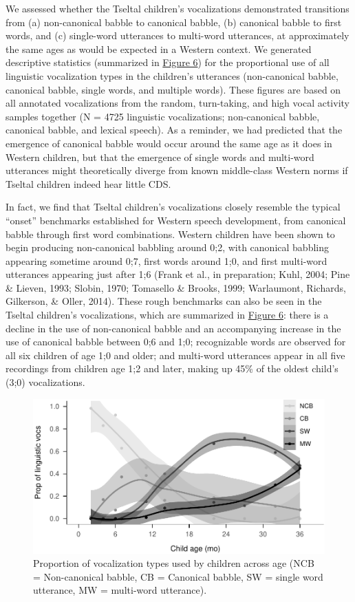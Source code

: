 \documentclass[,man,floatsintext]{apa6}
\begin{document}
We assessed whether the Tseltal children's vocalizations demonstrated
transitions from (a) non-canonical babble to canonical babble, (b)
canonical babble to first words, and (c) single-word utterances to
multi-word utterances, at approximately the same ages as would be
expected in a Western context. We generated descriptive statistics
(summarized in \protect\hyperlink{fig6}{Figure 6}) for the proportional
use of all linguistic vocalization types in the children's utterances
(non-canonical babble, canonical babble, single words, and multiple
words). These figures are based on all annotated vocalizations from the
random, turn-taking, and high vocal activity samples together (N = 4725
linguistic vocalizations; non-canonical babble, canonical babble, and
lexical speech). As a reminder, we had predicted that the emergence of
canonical babble would occur around the same age as it does in Western
children, but that the emergence of single words and multi-word
utterances might theoretically diverge from known middle-class Western
norms if Tseltal children indeed hear little CDS.

In fact, we find that Tseltal children's vocalizations closely resemble
the typical \enquote{onset} benchmarks established for Western speech
development, from canonical babble through first word combinations.
Western children have been shown to begin producing non-canonical
babbling around 0;2, with canonical babbling appearing sometime around
0;7, first words around 1;0, and first multi-word utterances appearing
just after 1;6 (Frank et al., in preparation; Kuhl, 2004; Pine \&
Lieven, 1993; Slobin, 1970; Tomasello \& Brooks, 1999; Warlaumont,
Richards, Gilkerson, \& Oller, 2014). These rough benchmarks can also be
seen in the Tseltal children's vocalizations, which are summarized in
\protect\hyperlink{fig6}{Figure 6}: there is a decline in the use of
non-canonical babble and an accompanying increase in the use of
canonical babble between 0;6 and 1;0; recognizable words are observed
for all six children of age 1;0 and older; and multi-word utterances
appear in all five recordings from children age 1;2 and later, making up
45\% of the oldest child's (3;0) vocalizations.

\begin{figure}
\centering
\includegraphics{Tseltal-CLE_files/figure-latex/fig6-1.pdf}
\caption{\label{fig:fig6}Proportion of vocalization types used by children
across age (NCB = Non-canonical babble, CB = Canonical babble, SW =
single word utterance, MW = multi-word utterance).}
\end{figure}
\end{document}

